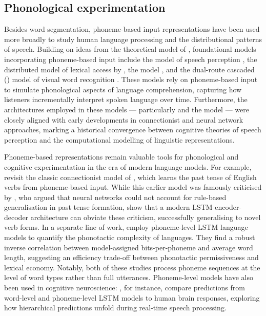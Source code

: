 


\subsection{Phonological experimentation}\label{sec:12-phonexperiment}


Besides word segmentation, phoneme-based input representations have been used more broadly to study human language processing and the distributional patterns of speech. Building on ideas from the theoretical  model of \citet{MARSLENWILSON1978}, foundational models incorporating phoneme-based input include the  model of speech perception \citep{mcclelland1986trace}, the distributed model of lexical access by \citet{seidenberg1989distributed}, the  model \citep{norris1994shortlist}, and the dual-route cascaded () model of visual word recognition \citep{coltheart2001drc}. These models rely on phoneme-based input to simulate phonological aspects of language comprehension, capturing how listeners incrementally interpret spoken language over time. Furthermore, the architectures employed in these models --- particularly  and the \citet{seidenberg1989distributed} model --- were closely aligned with early developments in connectionist and neural network approaches, marking a historical convergence between cognitive theories of speech perception and the computational modelling of linguistic representations.

Phoneme-based representations remain valuable tools for phonological and cognitive experimentation in the era of modern language models. For example, \citet{kirov-2018-recurrent} revisit the classic connectionist model of \citet{Rumelhart1986}, which learns the past tense of English verbs from phoneme-based input. While this earlier model was famously criticised by \citet{pinker_language_1988}, who argued that neural networks could not account for rule-based generalisation in past tense formation, \citet{kirov-2018-recurrent} show that a modern LSTM encoder-decoder architecture can obviate these criticism, successfully generalising to novel verb forms. In a separate line of work, \citet{pimentel2020phonotactic} employ phoneme-level LSTM language models to quantify the phonotactic complexity of  languages. They find a robust inverse correlation between model-assigned bits-per-phoneme and average word length, suggesting an efficiency trade-off between phonotactic permissiveness and lexical economy. Notably, both of these studies process phoneme sequences at the level of word types rather than full utterances. Phoneme-level models have also been used in cognitive neuroscience: \citet{donhauser2020two}, for instance, compare predictions from word-level and phoneme-level LSTM models to human brain responses, exploring how hierarchical predictions unfold during real-time speech processing.%


